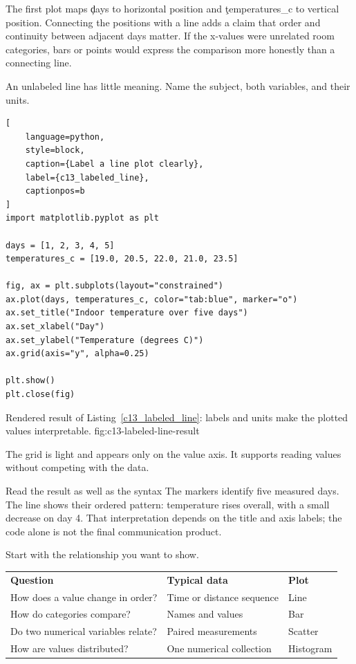 The first plot maps \c{days} to horizontal position and
\c{temperatures_c} to vertical position. Connecting the positions with a line
adds a claim that order and continuity between adjacent days matter. If the
x-values were unrelated room categories, bars or points would express the
comparison more honestly than a connecting line.


An unlabeled line has little meaning. Name the subject, both variables, and
their units.

\begin{lstlisting}[
    language=python,
    style=block,
    caption={Label a line plot clearly},
    label={c13_labeled_line},
    captionpos=b
]
import matplotlib.pyplot as plt

days = [1, 2, 3, 4, 5]
temperatures_c = [19.0, 20.5, 22.0, 21.0, 23.5]

fig, ax = plt.subplots(layout="constrained")
ax.plot(days, temperatures_c, color="tab:blue", marker="o")
ax.set_title("Indoor temperature over five days")
ax.set_xlabel("Day")
ax.set_ylabel("Temperature (degrees C)")
ax.grid(axis="y", alpha=0.25)

plt.show()
plt.close(fig)
\end{lstlisting}

{Rendered result of Listing~\ref{c13_labeled_line}: labels and units make the plotted values interpretable.}
{fig:c13-labeled-line-result}

The grid is light and appears only on the value axis. It supports reading
values without competing with the data.

\begin{ExplainBox}{Read the result as well as the syntax}
The markers identify five measured days. The line shows their ordered pattern:
temperature rises overall, with a small decrease on day 4. That interpretation
depends on the title and axis labels; the code alone is not the final
communication product.
\end{ExplainBox}


Start with the relationship you want to show.

\begin{center}
\begin{tabular}{lll}
\textbf{Question} & \textbf{Typical data} & \textbf{Plot} \\
How does a value change in order? & Time or distance sequence & Line \\
How do categories compare? & Names and values & Bar \\
Do two numerical variables relate? & Paired measurements & Scatter \\
How are values distributed? & One numerical collection & Histogram \\
\end{tabular}
\end{center}

